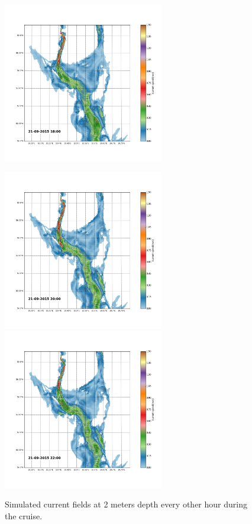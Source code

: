 \documentclass[12pt,a4paper,english]{article}
\begin{document}
\begin{figure}[h]
{\includegraphics*[trim=3.7cm 3cm 1.3cm 3.5cm,clip=true,height=7cm]{Python/stromfelt_76}
}
\centerline{
\includegraphics*[trim=2.0cm 3cm 6.0cm 3.5cm,clip=true,height=7cm]{Python/stromfelt_78}
\includegraphics*[trim=3.7cm 3cm 1.3cm 3.5cm,clip=true,height=7cm]{Python/stromfelt_80}
}
\caption{\small
Simulated current fields at 2 meters depth every other hour during the cruise.}
\label{fig:Current1}
\end{figure}
\end{document}
